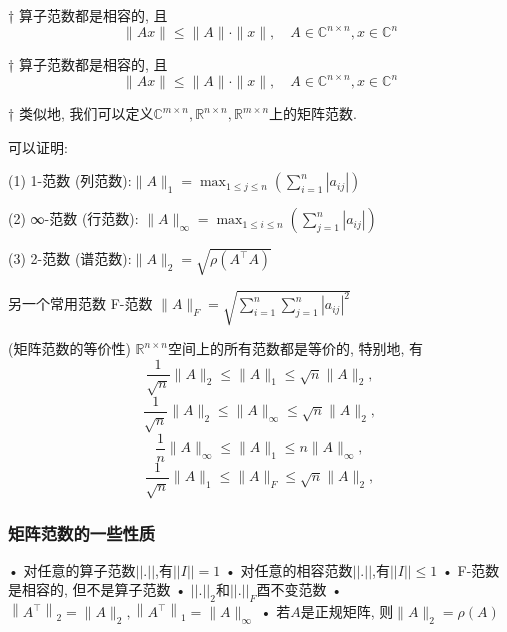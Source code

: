 \documentclass[12pt,a4paper]{article}
\begin{document}
\begin{framed}
† 算子范数都是相容的, 且$$ \|A x\| \leq\|A\| \cdot\|x\|, \quad A \in \mathbb{C}^{n \times n}, x \in \mathbb{C}^{n}$$
\end{framed}

\begin{framed}
	† 算子范数都是相容的, 且$$ \|A x\| \leq\|A\| \cdot\|x\|, \quad A \in \mathbb{C}^{n \times n}, x \in \mathbb{C}^{n}$$
\end{framed}

\begin{framed}
† 类似地, 我们可以定义$\mathbb{C}^{m \times n}, \mathbb{R}^{n \times n}, \mathbb{R}^{m \times n}$上的矩阵范数.
\end{framed}

\begin{framed}
	\begin{lemma}
		可以证明:
		
		(1) 1-范数 (列范数):$\|A\|_{1}=\max _{1 \leq j \leq n}\left(\sum_{i=1}^{n}\left|a_{i j}\right|\right)$
		
		(2) ∞-范数 (行范数): $\|A\|_{\infty}=\max _{1 \leq i \leq n}\left(\sum_{j=1}^{n}\left|a_{i j}\right|\right)$
		
		(3) 2-范数 (谱范数):$\|A\|_{2}=\sqrt{\rho\left(A^{\top} A\right)}$
		
	\end{lemma}
\end{framed}

另一个常用范数 F-范数 $\|A\|_{F}=\sqrt{\sum_{i=1}^{n} \sum_{j=1}^{n}\left|a_{i j}\right|^{2}}$

\begin{framed}
	\begin{theorem}(矩阵范数的等价性)
		$\mathbb{R}^{n×n}$空间上的所有范数都是等价的, 特别地, 有
		$$
		\frac{1}{\sqrt{n}}\|A\|_{2} \leq\|A\|_{1} \leq \sqrt{n}\|A\|_{2},
		$$
		$$
		\frac{1}{\sqrt{n}}\|A\|_{2} \leq\|A\|_{\infty} \leq \sqrt{n}\|A\|_{2},
		$$
		$$
		\frac{1}{n}\|A\|_{\infty} \leq\|A\|_{1} \leq n\|A\|_{\infty}
,
		$$
		$$
		\frac{1}{\sqrt{n}}\|A\|_{1} \leq\|A\|_{F} \leq \sqrt{n}\|A\|_{2}
,
		$$
	\end{theorem}
\end{framed}

\subsubsection{矩阵范数的一些性质}
• 对任意的算子范数$||.||$,有$||I|| = 1$
• 对任意的相容范数$||.||$,有$||I|| \leq 1$ 
• F-范数是相容的, 但不是算子范数
• $||.||_2$和$||.||_F$酉不变范数
• $\left\|A^{\top}\right\|_{2}=\|A\|_{2},\left\|A^{\top}\right\|_{1}=\|A\|_{\infty}$
• 若$A$是正规矩阵, 则$\|A\|_{2}=\rho(A)$
\end{document}

